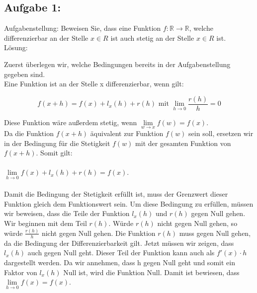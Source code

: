 \documentclass{article}
\begin{document}
\begin{multicols}{2}
\subsection{Aufgabe 1:} 
Aufgabenstellung:
Beweisen Sie, dass eine Funktion $f:\mathds{R} \rightarrow \mathds{R}$, welche differenzierbar an der Stelle $x \in R$ ist auch stetig an der Stelle $x \in R$ ist.\\ %

Lösung:

Zuerst überlegen wir, welche Bedingungen bereits in der Aufgabenstellung gegeben sind. \\
Eine Funktion ist an der Stelle x differenzierbar, wenn gilt:

\begin{equation}f(x+h)=f(x)+l_x(h)+ r(h) \text{ mit } \lim\limits_{h \rightarrow 0} \frac{r(h)}{h}= 0 \end{equation} 

Diese Funktion wäre außerdem stetig, wenn $\lim\limits_{w \rightarrow x} f(w)=f(x)$.\\
Da die Funktion $f(x+h)$ äquivalent zur Funktion $f(w)$ sein soll, ersetzen wir in der Bedingung für die Stetigkeit $f(w)$ mit der gesamten Funktion von $f(x+h)$.  
Somit gilt: \\ \\
$\lim\limits_{h \rightarrow 0} f(x)+l_x(h)+r(h)=f(x)$. \\ \\

Damit die Bedingung der Stetigkeit erfüllt ist, muss der Grenzwert dieser Funktion gleich dem Funktionswert sein. Um diese Bedingung zu erfüllen, müssen wir beweisen, dass die Teile der Funktion $l_x(h)$ und $r(h)$ gegen Null gehen. Wir beginnen mit dem Teil $r(h)$.  Würde $r(h)$ nicht gegen Null gehen, so würde $\frac{r(h)}{h}$ nicht gegen Null gehen. Die Funktion $r(h)$ muss gegen Null gehen, da die Bedingung der Differenzierbarkeit gilt. Jetzt müssen wir zeigen, dass $l_x(h)$ auch gegen Null geht. Dieser Teil der Funktion kann auch als $f'(x) \cdot h$ dargestellt werden. Da wir annehmen, dass h gegen Null geht und somit ein Faktor von $l_x(h)$ Null ist, wird die Funktion Null. Damit ist bewiesen, dass $\lim\limits_{h \rightarrow 0} f(x)=f(x)$. \\

\vspace{15pt}


\end{multicols}
\end{document}
